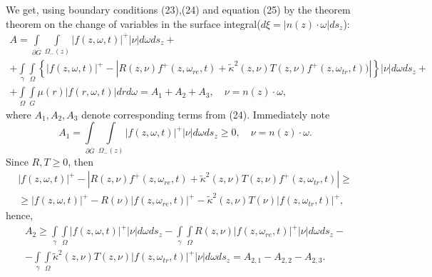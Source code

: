 \documentclass[12pt,reqno]{report}
\begin{document}
We get, using boundary conditions (23),(24) and equation (25) by the theorem  
theorem on the change of variables in the surface integral($ d\xi =
|n(z) \cdot \omega| d s_z$):
\begin{multline}
A =
\int \limits_{\partial \overline{G}} \int \limits_{\Omega_-(z)}
|f(z,\omega,t)|^+ |\nu | d \omega d s_z
+
\\+
\int \limits_{\gamma} \int \limits_{\Omega} \left
\{|f(z,\omega,t)|^+ - |R(z,\nu ) f^+(z,\omega_{re},t) +
\widetilde{\kappa}^2(z,\nu )T(z,\nu )
f^+(z,\omega_{tr},t) ) | \right\} |\nu |d\omega d s_z +\\
+ \int \limits_{\Omega} \int
\limits_G \mu(r) |f(r,\omega,t)| dr d\omega =A_1 +A_2 +A_3, \quad
\nu = n(z)\cdot \omega,
\end{multline}
where $A_1, A_2, A_3$ denote corresponding terms from (24). Immediately note
\begin{equation}
A_1 = \int \limits_{\partial \overline{G}} \int
\limits_{\Omega_-(z)}
|f(z,\omega,t)|^+ |\nu | d \omega d
s_z \geq 0, \quad \nu = n(z)\cdot \omega.
\end{equation}
Since $R, T \geq 0$, then
\begin{multline}
|f(z,\omega,t)|^+ - |R(z,\nu ) f^+(z,\omega_{re},t) +
\widetilde{\kappa}^2(z,\nu )T(z,\nu ) f^+(z,\omega_{tr},t) | \geq \\
\geq | f (z,\omega,t)|^+ - R(\nu ) |f(z,\omega_{re},t)|^+ -
\widetilde{\kappa}^2(z,\nu )T(\nu ) |f(z,\omega_{tr},t) |^+,
\end{multline}
hence,
\begin{multline}
A_2 \geq \int \limits_{\gamma} \int \limits_{\Omega}| f
(z,\omega,t)|^+|\nu | d\omega d s_z -   \int \limits_{\gamma} \int \limits_{\Omega}  R(z,\nu ) |f(z,\omega_{re},t)|^+ |\nu |d\omega d s_z - \\- 
 \int \limits_{\gamma} \int \limits_{\Omega} \widetilde{\kappa}^2(z,\nu )T(z,\nu ) |f(z,\omega_{tr},t) |^+ 
|\nu |d\omega d s_z = A_{2,1}- A_{2,2} - A_{2,3}.
\end{multline}
\end{document}

